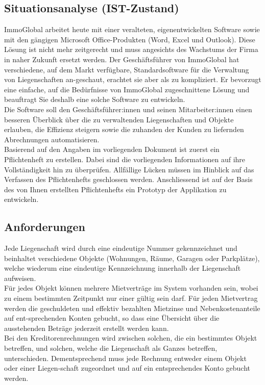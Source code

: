 \subsection{Situationsanalyse (IST-Zustand)}
ImmoGlobal arbeitet heute mit einer veralteten, eigenentwickelten Software sowie mit den gängigen Microsoft Office-Produkten (Word, Excel und Outlook). Diese Lösung ist nicht mehr zeitgerecht und muss angesichts des Wachstums der Firma in naher Zukunft ersetzt werden. Der Geschäftsführer von ImmoGlobal hat verschiedene, auf dem Markt verfügbare, Standardsoftware für die Verwaltung von Liegenschaften an-geschaut, erachtet sie aber als zu kompliziert. Er bevorzugt eine einfache, auf die Bedürfnisse von ImmoGlobal zugeschnittene Lösung und beauftragt Sie deshalb eine solche Software zu entwickeln.\\
Die Software soll den Geschäftsführer:innen und seinen Mitarbeiter:innen einen besseren Überblick über die zu verwaltenden Liegenschaften und Objekte erlauben, die Effizienz steigern sowie die zuhanden der Kunden zu liefernden Abrechnungen automatisieren.\\
Basierend auf den Angaben im vorliegenden Dokument ist zuerst ein Pflichtenheft zu erstellen. Dabei sind die vorliegenden Informationen auf ihre Vollständigkeit hin zu überprüfen. Allfällige Lücken müssen im Hinblick auf das Verfassen des Pflichtenhefts geschlossen werden. Anschliessend ist auf der Basis des von Ihnen erstellten Pflichtenhefts ein Prototyp der Applikation zu entwickeln.

\subsection{Anforderungen}
Jede Liegenschaft wird durch eine eindeutige Nummer gekennzeichnet und beinhaltet verschiedene Objekte (Wohnungen, Räume, Garagen oder Parkplätze), welche wiederum eine eindeutige Kennzeichnung innerhalb der Liegenschaft aufweisen.\\
Für jedes Objekt können mehrere Mietverträge im System vorhanden sein, wobei zu einem bestimmten Zeitpunkt nur einer gültig sein darf. Für jeden Mietvertrag werden die geschuldeten und effektiv bezahlten Mietzinse und Nebenkostenanteile auf ent-sprechenden Konten gebucht, so dass eine Übersicht über die ausstehenden Beträge jederzeit erstellt werden kann.\\
Bei den Kreditorenrechnungen wird zwischen solchen, die ein bestimmtes Objekt betreffen, und solchen, welche die Liegenschaft als Ganzes betreffen, unterschieden. Dementsprechend muss jede Rechnung entweder einem Objekt oder einer Liegen-schaft zugeordnet und auf ein entsprechendes Konto gebucht werden.\\

